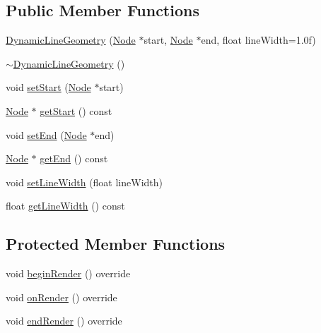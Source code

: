 \subsection*{Public Member Functions}
\begin{DoxyCompactItemize}
\item 
\mbox{\hyperlink{classec_1_1_dynamic_line_geometry_ad4c3c69fa4ae462be5e7f7856c083c84}{Dynamic\+Line\+Geometry}} (\mbox{\hyperlink{classec_1_1_node}{Node}} $\ast$start, \mbox{\hyperlink{classec_1_1_node}{Node}} $\ast$end, float line\+Width=1.\+0f)
\item 
\mbox{\hyperlink{classec_1_1_dynamic_line_geometry_aee42706b172e0e76cd290a4ae6897740}{$\sim$\+Dynamic\+Line\+Geometry}} ()
\item 
void \mbox{\hyperlink{classec_1_1_dynamic_line_geometry_a7354615fc961c1d6d6e9ec09bdb5bdf9}{set\+Start}} (\mbox{\hyperlink{classec_1_1_node}{Node}} $\ast$start)
\item 
\mbox{\hyperlink{classec_1_1_node}{Node}} $\ast$ \mbox{\hyperlink{classec_1_1_dynamic_line_geometry_a84dfd0f92891d7030790976be8606d98}{get\+Start}} () const
\item 
void \mbox{\hyperlink{classec_1_1_dynamic_line_geometry_a95e48c0fcda2b81310f99b0dc113701b}{set\+End}} (\mbox{\hyperlink{classec_1_1_node}{Node}} $\ast$end)
\item 
\mbox{\hyperlink{classec_1_1_node}{Node}} $\ast$ \mbox{\hyperlink{classec_1_1_dynamic_line_geometry_a877ec687c19743cc67520b5a419bad74}{get\+End}} () const
\item 
void \mbox{\hyperlink{classec_1_1_dynamic_line_geometry_ad2a5b06e7ea10c771ed17ff0ffce4b3a}{set\+Line\+Width}} (float line\+Width)
\item 
float \mbox{\hyperlink{classec_1_1_dynamic_line_geometry_a0b32e465ad6a232b96dc3a0cd404ae62}{get\+Line\+Width}} () const
\end{DoxyCompactItemize}
\subsection*{Protected Member Functions}
\begin{DoxyCompactItemize}
\item 
void \mbox{\hyperlink{classec_1_1_dynamic_line_geometry_ada76857787fc930fd44382e838842687}{begin\+Render}} () override
\item 
void \mbox{\hyperlink{classec_1_1_dynamic_line_geometry_ab56984cee973ef2a73ff67339014f0cf}{on\+Render}} () override
\item 
void \mbox{\hyperlink{classec_1_1_dynamic_line_geometry_afe9e7118c1c0fc09bd94c72284bfdafd}{end\+Render}} () override
\end{DoxyCompactItemize}
